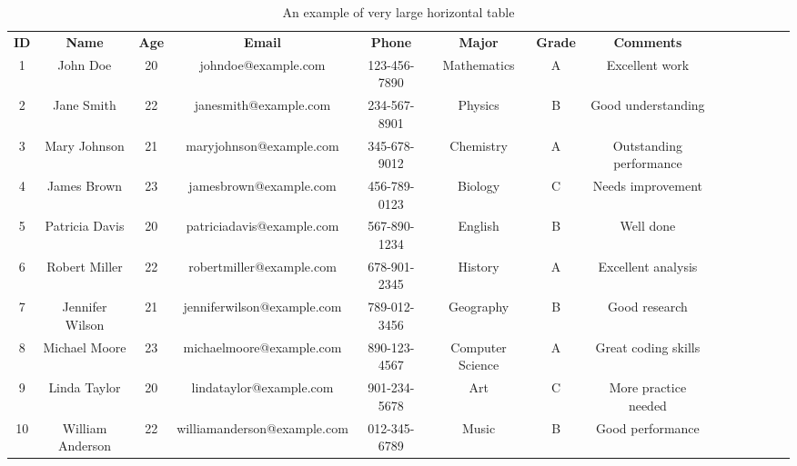 \begin{landscape}
\begin{longtable}{cccccccccccccc}
\label{tab:wide_table_example}\\
\caption{An example of very large horizontal table}\\
\hline\endhead  %
\hline\endfoot  %
\hline
\textbf{ID} & \textbf{Name} & \textbf{Age} & \textbf{Email} & \textbf{Phone} & \textbf{Major} & \textbf{Grade} & \textbf{Comments} \\
\hline
1 & John Doe & 20 & johndoe@example.com & 123-456-7890 & Mathematics & A & Excellent work \\

2 & Jane Smith & 22 & janesmith@example.com & 234-567-8901 & Physics & B & Good understanding \\

3 & Mary Johnson & 21 & maryjohnson@example.com & 345-678-9012 & Chemistry & A & Outstanding performance \\

4 & James Brown & 23 & jamesbrown@example.com & 456-789-0123 & Biology & C & Needs improvement \\

5 & Patricia Davis & 20 & patriciadavis@example.com & 567-890-1234 & English & B & Well done \\

6 & Robert Miller & 22 & robertmiller@example.com & 678-901-2345 & History & A & Excellent analysis \\

7 & Jennifer Wilson & 21 & jenniferwilson@example.com & 789-012-3456 & Geography & B & Good research \\

8 & Michael Moore & 23 & michaelmoore@example.com & 890-123-4567 & Computer Science & A & Great coding skills \\

9 & Linda Taylor & 20 & lindataylor@example.com & 901-234-5678 & Art & C & More practice needed \\

10 & William Anderson & 22 & williamanderson@example.com & 012-345-6789 & Music & B & Good performance \\
\hline
\end{longtable}
\end{landscape}